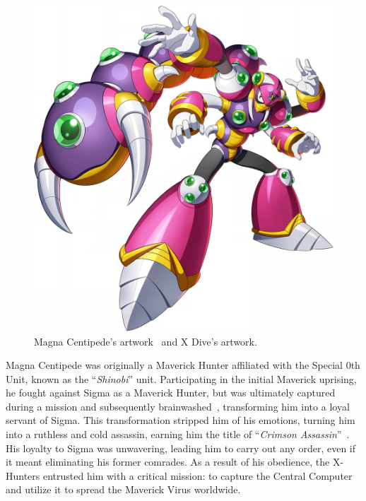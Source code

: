 \begin{figure}[htp]
	\includegraphics[height=\portraitsize]{figures/X2/Magna_centipede/XMagna_Centipede.png}
	\caption{Magna Centipede's artwork~\cite{book:MMX_Complete_art} and X Dive's artwork.}
\end{figure}
Magna Centipede was originally a Maverick Hunter affiliated with the Special 0th Unit, known as the ``\textit{Shinobi}'' unit. Participating in the initial Maverick uprising, he fought against Sigma as a Maverick Hunter, but was ultimately captured during a mission and subsequently brainwashed~\cite{wayback:X2_resources}, transforming him into a loyal servant of Sigma. This transformation stripped him of his emotions, turning him into a ruthless and cold assassin, earning him the title of ``\textit{Crimson Assassin}''~\cite{book:MMX_Complete_art}. His loyalty to Sigma was unwavering, leading him to carry out any order, even if it meant eliminating his former comrades. As a result of his obedience, the X-Hunters entrusted him with a critical mission: to capture the Central Computer and utilize it to spread the Maverick Virus worldwide. 
